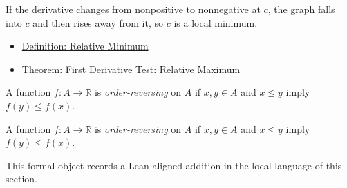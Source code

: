 \begin{remark*}[Interpretation]
If the derivative changes from nonpositive to nonnegative at $c$, the graph falls into $c$ and then rises away from it, so $c$ is a local minimum.
\end{remark*}

\begin{dependencies}
\begin{itemize}
  \item \hyperref[def:relative-minimum]{Definition: Relative Minimum}
  \item \hyperref[thm:first-derivative-test-maximum]{Theorem: First Derivative Test: Relative Maximum}
\end{itemize}
\end{dependencies}

\begin{definition}
\label{def:order-reversing}
A function $f:A\to\mathbb R$ is \emph{order-reversing} on $A$ if $x,y\in A$ and $x\le y$ imply $f(y)\le f(x)$.
\end{definition}

\begin{remark*}
A function $f:A\to\mathbb R$ is \emph{order-reversing} on $A$ if $x,y\in A$ and $x\le y$ imply $f(y)\le f(x)$.
\end{remark*}

\begin{remark*}[Interpretation]
This formal object records a Lean-aligned addition in the local language of this section.
\end{remark*}

\begin{dependencies}
\NoLocalDependencies
\end{dependencies}

